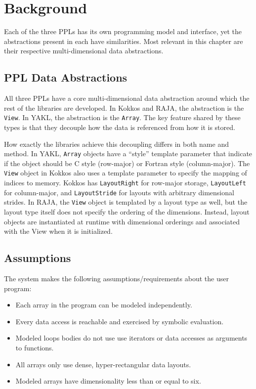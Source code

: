\section{Background}

Each of the three PPLs has its own programming model and interface, yet the abstractions present in each have similarities.
Most relevant in this chapter are their respective multi-dimensional data abstractions.

\subsection{PPL Data Abstractions}

All three PPLs have a core multi-dimensional data abstraction around which the rest of the libraries are developed.
In Kokkos and RAJA, the abstraction is the \verb.View..
In YAKL, the abstraction is the \verb.Array..
The key feature shared by these types is that they decouple how the data is referenced from how it is stored.

How exactly the libraries achieve this decoupling differs in both name and method.
In YAKL, \verb.Array. objects have a ``style'' template parameter that indicate if the object should be C style (row-major) or Fortran style (column-major). 
The \verb.View. object in Kokkos also uses a template parameter to specify the mapping of indices to memory.
Kokkos has \verb.LayoutRight. for row-major storage, \verb.LayoutLeft. for column-major, and \verb.LayoutStride. for layouts with arbitrary dimensional strides.
In RAJA, the \verb.View. object is templated by a layout type as well, but the layout type itself does not specify the ordering of the dimensions. 
Instead, layout objects are instantiated at runtime with dimensional orderings and associated with the View when it is initialized.

\subsection{Assumptions}
The \FormatDecisions{} system makes the following assumptions/requirements about the user program:
\begin{itemize}
\item Each array in the program can be modeled independently.
\item Every data access is reachable and exercised by symbolic evaluation.
\item Modeled loops bodies do not use use iterators or data accesses as arguments to functions.
\item All arrays only use dense, hyper-rectangular data layouts.
\item Modeled arrays have dimensionality less than or equal to six.
\end{itemize}


